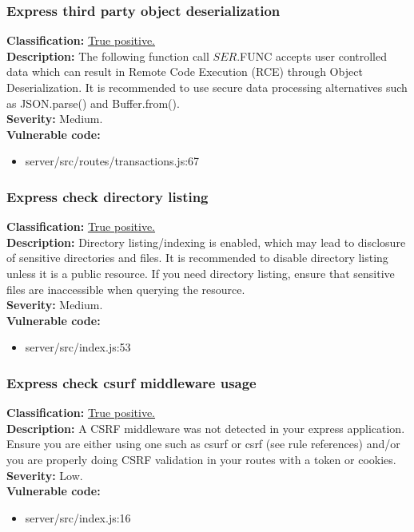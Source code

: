 \documentclass[]{article}
\begin{document}
\subsubsection{Express third party object deserialization}
\textbf{Classification:} \hyperref[subsubsec:deserialization_of_untrusted_data]{True positive.} \\ 
\textbf{Description:} The following function call $SER.$FUNC accepts user controlled data which 
can result in Remote Code Execution (RCE) through Object Deserialization. It is recommended to 
use secure data processing alternatives such as JSON.parse() and Buffer.from(). \\ 
\textbf{Severity:} Medium. \\ 
\textbf{Vulnerable code:} 
\begin{itemize}
    \item server/src/routes/transactions.js:67
\end{itemize}

\subsubsection{Express check directory listing}
\textbf{Classification:} \hyperref[subsubsec:exposure_of_information_through_directory_listing]{True positive.} \\ 
\textbf{Description:} Directory listing/indexing is enabled, which may lead to disclosure of sensitive directories 
and files. It is recommended to disable directory listing unless it is a public resource. If you need directory listing, 
ensure that sensitive files are inaccessible when querying the resource. \\ 
\textbf{Severity:} Medium. \\ 
\textbf{Vulnerable code:} 
\begin{itemize}
    \item server/src/index.js:53
\end{itemize}

\subsubsection{Express check csurf middleware usage}
\textbf{Classification:} \hyperref[subsubsec:csrf_with_samesite_none_misconfiguration]{True positive.} \\ 
\textbf{Description:} A CSRF middleware was not detected in your express application. Ensure you are either using 
one such as csurf or csrf (see rule references) and/or you are properly doing CSRF validation in your routes with 
a token or cookies.\\ 
\textbf{Severity:} Low. \\ 
\textbf{Vulnerable code:} 
\begin{itemize}
    \item server/src/index.js:16
\end{itemize}
\end{document}
